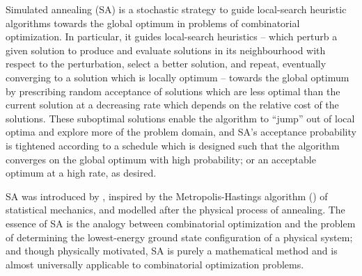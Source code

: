 Simulated annealing (SA) is a stochastic strategy to guide local-search heuristic algorithms towards the global optimum in problems of combinatorial optimization. In particular, it guides local-search heuristics -- which perturb a given solution to produce and evaluate solutions in its neighbourhood with respect to the perturbation, select a better solution, and repeat, eventually converging to a solution which is locally optimum -- towards the global optimum by prescribing random acceptance of solutions which are less optimal than the current solution at a decreasing rate which depends on the relative cost of the solutions. These suboptimal solutions enable the algorithm to ``jump'' out of local optima and explore more of the problem domain, and SA's acceptance probability is tightened according to a schedule which is designed such that the algorithm converges on the global optimum with high probability; or an acceptable optimum at a high rate, as desired.

SA was introduced by \textcite{Kirkpatrick671}, inspired by the Metropolis-Hastings algorithm (\cite{metro53}) of statistical mechanics, and modelled after the physical process of annealing. The essence of SA is the analogy between combinatorial optimization and the problem of determining the lowest-energy ground state configuration of a physical system; and though physically motivated, SA is purely a mathematical method and is almost universally applicable to combinatorial optimization problems.

